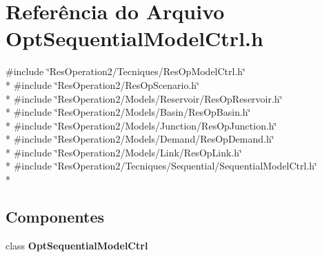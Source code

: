 \section{Referência do Arquivo Opt\+Sequential\+Model\+Ctrl.\+h}
\label{_opt_sequential_model_ctrl_8h}
{\ttfamily \#include \char`\"{}Res\+Operation2/\+Tecniques/\+Res\+Op\+Model\+Ctrl.\+h\char`\"{}}\\*
{\ttfamily \#include \char`\"{}Res\+Operation2/\+Res\+Op\+Scenario.\+h\char`\"{}}\\*
{\ttfamily \#include \char`\"{}Res\+Operation2/\+Models/\+Reservoir/\+Res\+Op\+Reservoir.\+h\char`\"{}}\\*
{\ttfamily \#include \char`\"{}Res\+Operation2/\+Models/\+Basin/\+Res\+Op\+Basin.\+h\char`\"{}}\\*
{\ttfamily \#include \char`\"{}Res\+Operation2/\+Models/\+Junction/\+Res\+Op\+Junction.\+h\char`\"{}}\\*
{\ttfamily \#include \char`\"{}Res\+Operation2/\+Models/\+Demand/\+Res\+Op\+Demand.\+h\char`\"{}}\\*
{\ttfamily \#include \char`\"{}Res\+Operation2/\+Models/\+Link/\+Res\+Op\+Link.\+h\char`\"{}}\\*
{\ttfamily \#include \char`\"{}Res\+Operation2/\+Tecniques/\+Sequential/\+Sequential\+Model\+Ctrl.\+h\char`\"{}}\\*
\subsection*{Componentes}
\begin{DoxyCompactItemize}
\item 
class {\bf Opt\+Sequential\+Model\+Ctrl}
\end{DoxyCompactItemize}
